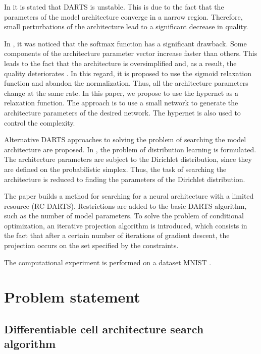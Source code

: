 \documentclass[runningheads]{llncs}
\begin{document}
In \cite{journals/corr/abs-2002-05283} it is stated that DARTS is unstable. This is due to the fact that the parameters of the model architecture converge in a narrow region. Therefore, small perturbations of the architecture lead to a significant decrease in quality.

In \cite{journals/corr/abs-1911-12126}, it was noticed that the $\mathrm{softmax}$ function has a significant drawback. Some components of the architecture parameter vector increase faster than others. This leads to the fact that the architecture is oversimplified and, as a result, the quality deteriorates \cite{journals/corr/abs-1911-12126}. In this regard, it is proposed to use the sigmoid relaxation function and abandon the normalization. Thus, all the architecture parameters change at the same rate. In this paper, we propose to use the hypernet \cite{journals/corr/HaDL16} as a relaxation function. The approach is to use a small network to generate the architecture parameters of the desired network. The hypernet is also used to control the complexity.

Alternative DARTS approaches to solving the problem of searching the model architecture are proposed. In \cite{journals/corr/abs-2006-10355}, the problem of distribution learning is formulated. The architecture parameters are subject to the Dirichlet distribution, since they are defined on the probabilistic simplex. Thus, the task of searching the architecture is reduced to finding the parameters of the Dirichlet distribution.

The paper \cite{journals/corr/abs-1912-12814} builds a method for searching for a neural architecture with a limited resource (RC-DARTS). Restrictions are added to the basic DARTS algorithm, such as the number of model parameters. To solve the problem of conditional optimization, an iterative projection algorithm is introduced, which consists in the fact that after a certain number of iterations of gradient descent, the projection occurs on the set specified by the constraints.

The computational experiment is performed on a dataset MNIST \cite{lecun-mnisthandwrittendigit-2010}.

\section{Problem statement}

\subsection{Differentiable cell architecture search algorithm}
\end{document}
